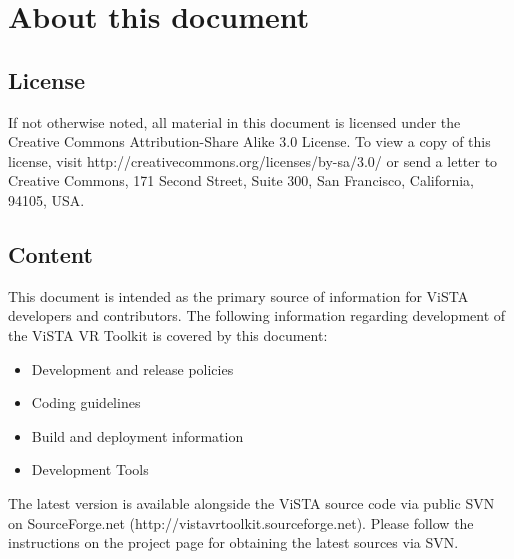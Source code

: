 



\section{About this document}

\subsection{License}
If not otherwise noted, all material in this document is licensed under the Creative Commons Attribution-Share Alike 3.0 License. 
To view a copy of this license, visit http://creativecommons.org/licenses/by-sa/3.0/ or send a letter to Creative Commons, 171 Second Street, Suite 300, San Francisco, California, 94105, USA.

\subsection{Content}

This document is intended as the primary source of information for ViSTA developers and contributors.
The following information regarding development of the ViSTA VR Toolkit is covered by this document:

\begin{itemize}
\item Development and release policies
\item Coding guidelines
\item Build and deployment information
\item Development Tools
\end{itemize}

The latest version is available alongside the ViSTA source code via public SVN on SourceForge.net (http://vistavrtoolkit.sourceforge.net).
Please follow the instructions on the project page for obtaining the latest sources via SVN.
